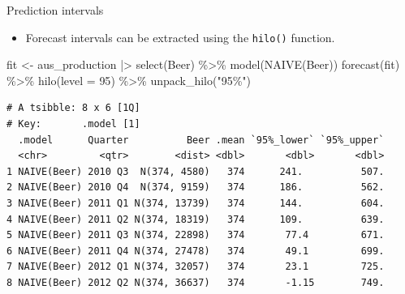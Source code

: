\documentclass[
  14pt,
  ignorenonframetext,
  aspectratio=169,
]{beamer}
\newenvironment{Shaded}{\begin{snugshade}}{\end{snugshade}}
\newcommand{\AttributeTok}[1]{\textcolor[rgb]{0.77,0.63,0.00}{#1}}
\newcommand{\DecValTok}[1]{\textcolor[rgb]{0.00,0.00,0.81}{#1}}
\newcommand{\FunctionTok}[1]{\textcolor[rgb]{0.00,0.00,0.00}{#1}}
\newcommand{\NormalTok}[1]{\textcolor[rgb]{0.00,0.00,0.00}{#1}}
\newcommand{\OtherTok}[1]{\textcolor[rgb]{0.56,0.35,0.01}{#1}}
\newcommand{\SpecialCharTok}[1]{\textcolor[rgb]{0.00,0.00,0.00}{#1}}
\newcommand{\StringTok}[1]{\textcolor[rgb]{0.31,0.60,0.02}{#1}}
\providecommand{\tightlist}{%
  \setlength{\itemsep}{0pt}\setlength{\parskip}{0pt}}\usepackage{longtable,booktabs,array}
\renewenvironment{Shaded}{\vspace*{0.15cm}\color{black}\fontsize{10}{10}\sf\begin{snugshade}\color{black}}{\end{snugshade}}
\begin{document}
\begin{frame}[fragile]{Prediction intervals}
\protect\hypertarget{prediction-intervals-1}{}
\begin{itemize}
\tightlist
\item
  Forecast intervals can be extracted using the \texttt{hilo()}
  function.
\end{itemize}

\fontsize{10}{13}\sf

\begin{Shaded}
\begin{Highlighting}[]
\NormalTok{fit }\OtherTok{\textless{}{-}}\NormalTok{ aus\_production }\SpecialCharTok{|\textgreater{}} \FunctionTok{select}\NormalTok{(Beer) }\SpecialCharTok{\%\textgreater{}\%} \FunctionTok{model}\NormalTok{(}\FunctionTok{NAIVE}\NormalTok{(Beer))}
\FunctionTok{forecast}\NormalTok{(fit) }\SpecialCharTok{\%\textgreater{}\%} \FunctionTok{hilo}\NormalTok{(}\AttributeTok{level =} \DecValTok{95}\NormalTok{) }\SpecialCharTok{\%\textgreater{}\%} \FunctionTok{unpack\_hilo}\NormalTok{(}\StringTok{"95\%"}\NormalTok{)}
\end{Highlighting}
\end{Shaded}

\begin{verbatim}
# A tsibble: 8 x 6 [1Q]
# Key:       .model [1]
  .model      Quarter          Beer .mean `95%_lower` `95%_upper`
  <chr>         <qtr>        <dist> <dbl>       <dbl>       <dbl>
1 NAIVE(Beer) 2010 Q3  N(374, 4580)   374      241.          507.
2 NAIVE(Beer) 2010 Q4  N(374, 9159)   374      186.          562.
3 NAIVE(Beer) 2011 Q1 N(374, 13739)   374      144.          604.
4 NAIVE(Beer) 2011 Q2 N(374, 18319)   374      109.          639.
5 NAIVE(Beer) 2011 Q3 N(374, 22898)   374       77.4         671.
6 NAIVE(Beer) 2011 Q4 N(374, 27478)   374       49.1         699.
7 NAIVE(Beer) 2012 Q1 N(374, 32057)   374       23.1         725.
8 NAIVE(Beer) 2012 Q2 N(374, 36637)   374       -1.15        749.
\end{verbatim}
\end{frame}
\end{document}
